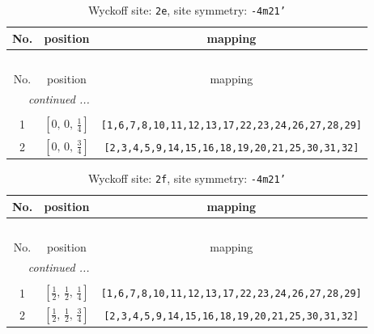 \documentclass[fleqn,8pt]{jsarticle}
\begin{document}
\begin{longtable}{ccc}
\caption{Wyckoff site: {\tt 2e}, site symmetry: {\tt -4m21'}}
 \\
 \hline \hline
No. & position & mapping \\ \hline \endfirsthead

\multicolumn{2}{l}{\tablename\ \thetable{}} \\
 \hline \hline
No. & position & mapping \\ \hline \endhead

 \hline \hline
\multicolumn{2}{r}{\footnotesize\it continued ...} \\ \endfoot

 \hline \hline
\multicolumn{2}{r}{} \\ \endlastfoot

1 & $\left[ 0,\, 0,\, \frac{1}{4} \right]$ & {\tt [1,6,7,8,10,11,12,13,17,22,23,24,26,27,28,29]} \\ \hline
2 & $\left[ 0,\, 0,\, \frac{3}{4} \right]$ & {\tt [2,3,4,5,9,14,15,16,18,19,20,21,25,30,31,32]} \\
\end{longtable}
\renewcommand{\arraystretch}{1.2}
\begin{longtable}{ccc}
\caption{Wyckoff site: {\tt 2f}, site symmetry: {\tt -4m21'}}
 \\
 \hline \hline
No. & position & mapping \\ \hline \endfirsthead

\multicolumn{2}{l}{\tablename\ \thetable{}} \\
 \hline \hline
No. & position & mapping \\ \hline \endhead

 \hline \hline
\multicolumn{2}{r}{\footnotesize\it continued ...} \\ \endfoot

 \hline \hline
\multicolumn{2}{r}{} \\ \endlastfoot

1 & $\left[ \frac{1}{2},\, \frac{1}{2},\, \frac{1}{4} \right]$ & {\tt [1,6,7,8,10,11,12,13,17,22,23,24,26,27,28,29]} \\ \hline
2 & $\left[ \frac{1}{2},\, \frac{1}{2},\, \frac{3}{4} \right]$ & {\tt [2,3,4,5,9,14,15,16,18,19,20,21,25,30,31,32]} \\
\end{longtable}
\renewcommand{\arraystretch}{1.2}
\end{document}
